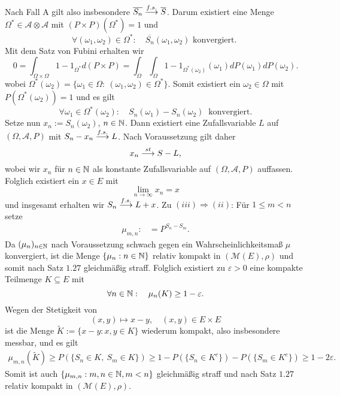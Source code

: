 \begin{proof*}
$$    $$
    Nach Fall A gilt also insbesondere $\overline{S_n} \overset{f.s.}{\longrightarrow}  \overline{S}$. Darum existiert eine Menge $\Omega^* \in \mathcal{A}\otimes\mathcal{A}$ mit \mbox{$(P\times P)(\Omega^*) = 1$} und
    $$  
        \forall (\omega_1, \omega_2) \in \Omega^*: \quad \overline{S_n}(\omega_1, \omega_2) \text{ konvergiert. }
    $$
    Mit dem Satz von Fubini erhalten wir
    $$
        0 = \int_{\Omega \times \Omega}1 - 1_{\Omega^*} d(P \times P) = \int_{\Omega}\int_{\Omega}1 - 1_{\Omega^*(\omega_2)}(\omega_1)dP(\omega_1)dP(\omega_2). 
    $$
    wobei $\Omega^*(\omega_2) =\{\omega_1\in\Omega: \ (\omega_1, \omega_2) \in \Omega^* \}$. Somit existiert ein $\omega_2 \in \Omega$ mit $P(\Omega^*(\omega_2)) = 1$ und es gilt
    $$
        \forall \omega_1 \in \Omega^*(\omega_2): \quad S_n(\omega_1) - S_n(\omega_2) \ \text{ konvergiert.}
    $$
    Setze nun $x_n := S_n(\omega_2)$, $n \in \mathbb{N}$. Dann existiert eine Zufallsvariable $L$ auf $(\Omega, \mathcal{A}, P)$ mit \mbox{$S_n - x_n \overset{f.s.}{\longrightarrow} L$.} Nach Voraussetzung gilt daher 
    $$
        x_n \overset{st}{\longrightarrow} S - L,
    $$
    wobei wir $x_n$ für $n \in \mathbb{N}$ als konstante Zufallsvariable auf $(\Omega, \mathcal{A}, P)$ auffassen. Folglich existiert ein $x \in E$ mit 
    $$
        \lim_{n \to \infty}x_n = x
    $$
    und insgesamt erhalten wir $S_n \overset{f.s.}{\longrightarrow} L + x$. 
    \newline 
    Zu $(iii) \Rightarrow (ii)$: Für $1 \leq m < n$ setze
    \begin{align*}
        \mu_{m,n} :&= P^{S_n - S_m}. 
    \end{align*}
    Da $(\mu_n)_{n \in \mathbb{N}}$ nach Voraussetzung schwach gegen ein Wahrscheinlichkeitsmaß $\mu$ konvergiert,
    ist die Menge $\{\mu_n: n \in \mathbb{N} \}$ relativ kompakt in $(\mathcal{M}(E), \rho)$ und somit nach Satz $1.27$ gleichmäßig straff.
    Folglich existiert zu $\varepsilon > 0$ eine kompakte Teilmenge $K \subseteq E$ mit 
    $$
        \forall n \in \mathbb{N}: \quad \mu_n(K) \geq 1 - \varepsilon. 
    $$
    Wegen der Stetigkeit von 
    $$
        (x,y) \mapsto x - y, \quad (x,y) \in E \times E
    $$
    ist die Menge $\tilde{K} := \{x - y : x,y \in K \}$ wiederum kompakt, also insbesondere messbar, und es gilt
    \begin{align*}
        \mu_{m,n}(\tilde{K}) \geq P(\{S_n \in K, \ S_m \in K\}) \geq 1 - P(\{S_n \in K^c\}) - P(\{S_m \in K^c\}) \geq 1 - 2\varepsilon.
    \end{align*}
    Somit ist auch $\{\mu_{m,n}: m,n \in \mathbb{N}, m < n \}$ gleichmäßig straff und nach Satz $1.27$ relativ kompakt in $(\mathcal{M}(E), \rho)$. 

\end{proof*}

